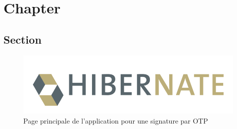 \chapter{Chapter}

\section{Section}

\begin{figure}[h]
	\begin{center}
		\centerline{\includegraphics[width=1.0\textwidth]{images/30-hibernate.png}}
	\end{center}
	\caption{Page principale de l'application pour une signature par OTP}
\end{figure}
